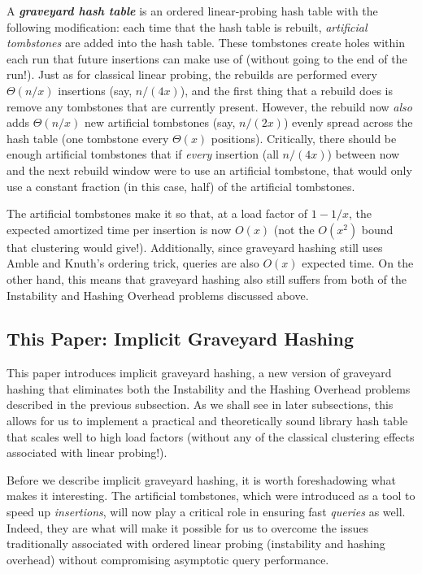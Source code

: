 \documentclass[10pt]{article}
\theoremstyle{remark}
\theoremstyle{remark}
\newcommand{\defn}[1]{\textbf{\emph{#1}}}
\begin{document}
A \defn{graveyard hash table} is an ordered linear-probing hash table with the following modification: each time that the hash table is rebuilt, \emph{artificial tombstones} are added into the hash table. These tombstones create holes within each run that future insertions can make use of (without going to the end of the run!). Just as for classical linear probing, the rebuilds are performed every $\Theta(n/x)$ insertions (say, $n/(4x)$), and the first thing that a rebuild does is remove any tombstones that are currently present. However, the rebuild now \emph{also} adds $\Theta(n/x)$ new artificial tombstones (say, $n/(2x)$) evenly spread across the hash table (one tombstone every $\Theta(x)$ positions). Critically, there should be enough artificial tombstones that if \emph{every} insertion (all $n/(4x)$) between now and the next rebuild window were to use an artificial tombstone, that would only use a constant fraction (in this case, half) of the artificial tombstones.

The artificial tombstones make it so that, at a load factor of $1- 1/x$, the expected amortized time per insertion is now $O(x)$ (not the $O(x^2)$ bound that clustering would give!). Additionally, since graveyard hashing still uses Amble and Knuth's ordering trick, queries are also $O(x)$ expected time. On the other hand, this means that graveyard hashing also still suffers from both of the Instability and Hashing Overhead problems discussed above.

\subsection{This Paper: Implicit Graveyard Hashing}

This paper introduces implicit graveyard hashing, a new version of graveyard hashing that eliminates both the Instability and the Hashing Overhead problems described in the previous subsection. As we shall see in later subsections, this allows for us to implement a practical and theoretically sound library hash table that scales well to high load factors (without any of the classical clustering effects associated with linear probing!).

Before we describe implicit graveyard hashing, it is worth foreshadowing what makes it interesting. The artificial tombstones, which were introduced as a tool to speed up \emph{insertions}, will now play a critical role in ensuring fast \emph{queries} as well. Indeed, they are what will make it possible for us to overcome the issues traditionally associated with ordered linear probing (instability and hashing overhead) without compromising asymptotic query performance.
\end{document}
